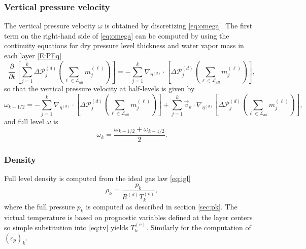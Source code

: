 \documentclass{agujournal}
\begin{document}
\subsubsection{Vertical pressure velocity}
The vertical pressure velocity $\omega$ is obtained by discretizing \eqref{eq:omega}. The first term on the right-hand side of \eqref{eq:omega} can be computed by using the continuity equations for dry pressure level thickness and water vapor mass in each layer \eqref{E:PEq}
\begin{equation}
\frac{\partial }{\partial t}\left[\sum_{j=1}^k \Delta \mathcal{P}^{(d)}_j \left( \sum_{\ell \in \mathcal{L}_{all}} m_j^{(\ell)}\right)\right] = -\sum_{j=1}^k \nabla_{\eta^{(d)}}\cdot \left[ \Delta \mathcal{P}^{(d)}_j\left(\sum_{\ell \in \mathcal{L}_{all}} m_j^{(\ell)} \right)\right],
\end{equation}
so that the vertical pressure velocity at half-levels is given by
\begin{equation}
\omega_{k+1/2}=-\sum_{j=1}^k \nabla_{\eta^{(d)}}\cdot \left[ \Delta \mathcal{P}^{(d)}_j\left(\sum_{\ell \in \mathcal{L}_{all}} m_j^{(\ell)} \right)\right]+\sum_{j=1}^k \vec{v}_k \cdot \nabla_{\eta^{(d)}}\left[ \Delta \mathcal{P}^{(d)}_j\left( \sum_{\ell \in \mathcal{L}_{all}} m_j^{(\ell)}\right)\right],
\end{equation}
and full level $\omega$ is
\begin{equation}
\omega_k=\frac{\omega_{k+1/2}+\omega_{k-1/2}}{2}.
\end{equation}
\subsubsection{Density}
Full level density is computed from the ideal gas law \eqref{eq:igl}
\begin{equation}
\rho_k=\frac{p_k}{R^{(d)} T_k^{(v)}},
\end{equation}
where the full pressure $p_k$ is computed as described in section \ref{sec:pk}. The virtual temperature is based on prognostic variables defined at the layer centers so simple substitution into \eqref{eq:tv} yields $T_k^{(v)}$. Similarly for the computation of $\left( c_p\right)_k$.
\end{document}
